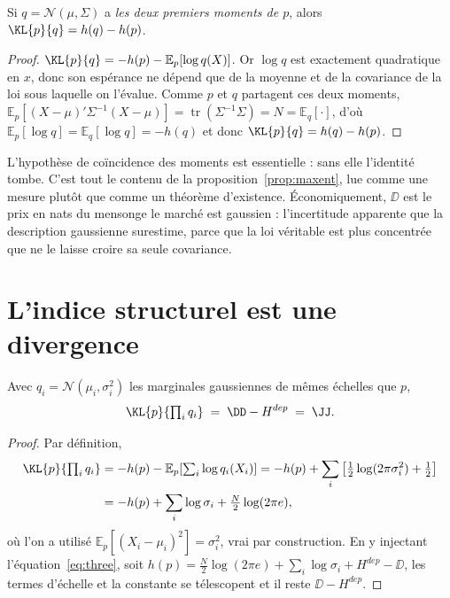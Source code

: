 \begin{proposition}
\label{prop:deficit}
Si $q=\mathcal N(\mu,\Sigma)$ a \emph{les deux premiers moments de $p$}, alors
$\KL{p}{q}=h(q)-h(p)$.
\end{proposition}

\begin{proof}
$\KL{p}{q}=-h(p)-\mathbb{E}_p[\log q(X)]$. Or $\log q$ est exactement
quadratique en $x$, donc son espérance ne dépend que de la moyenne et de la
covariance de la loi sous laquelle on l'évalue. Comme $p$ et $q$ partagent ces
deux moments,
$\mathbb{E}_p\!\left[(X-\mu)'\Sigma^{-1}(X-\mu)\right]=\operatorname{tr}(\Sigma^{-1}\Sigma)=N
=\mathbb{E}_q[\cdot]$, d'où $\mathbb{E}_p[\log q]=\mathbb{E}_q[\log q]=-h(q)$ et
donc $\KL{p}{q}=h(q)-h(p)$.
\end{proof}

L'hypothèse de coïncidence des moments est essentielle : sans elle l'identité
tombe. C'est tout le contenu de la proposition~\ref{prop:maxent}, lue comme une
mesure plutôt que comme un théorème d'existence. Économiquement, $\DD$ est le
prix en nats du mensonge \og le marché est gaussien \fg{} : l'incertitude
apparente que la description gaussienne surestime, parce que la loi véritable est
plus concentrée que ne le laisse croire sa seule covariance.

\section{L'indice structurel est une divergence}
\label{app:index}

\begin{proposition}
\label{prop:index}
Avec $q_i=\mathcal N(\mu_i,\sigma_i^2)$ les marginales gaussiennes de mêmes
échelles que $p$,
\[
\KL{p}{\textstyle\prod_i q_i} \;=\; \DD - H^{dep} \;=\; \JJ .
\]
\end{proposition}

\begin{proof}
Par définition,
\[
\begin{aligned}
\KL{p}{\textstyle\prod_i q_i} &= -h(p) - \mathbb{E}_p\!\left[\textstyle\sum_i\log q_i(X_i)\right]
= -h(p) + \sum_i\left[\tfrac12\log(2\pi\sigma_i^2)+\tfrac12\right]\\
&= -h(p) + \sum_i\log\sigma_i + \tfrac N2\log(2\pi e),
\end{aligned}
\]
où l'on a utilisé $\mathbb{E}_p[(X_i-\mu_i)^2]=\sigma_i^2$, vrai par
construction. En y injectant l'équation~\eqref{eq:three}, soit
$h(p)=\tfrac N2\log(2\pi e)+\sum_i\log\sigma_i+H^{dep}-\DD$, les termes
d'échelle et la constante se télescopent et il reste $\DD-H^{dep}$.
\end{proof}

